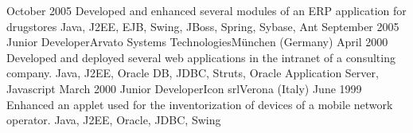 \begin{experiences}
  {October 2005}    {
  					    Developed and enhanced several modules of an ERP application for drugstores
  					}   
                    {Java, J2EE, EJB, Swing, JBoss, Spring, Sybase, Ant}
  \emptySeparator
  \consultantexperience
  {September 2005}   {Junior Developer}{Arvato Systems Technologies}{München (Germany)}
  {April 2000}       {
                     	  Developed and deployed several web applications in the intranet of a consulting company.
                     }
                     {Java, J2EE, Oracle DB, JDBC, Struts, Oracle Application Server, Javascript}
  \emptySeparator
  \consultantexperience
  {March 2000}  	{Junior Developer}{Icon srl}{Verona (Italy)}
  {June 1999}   	{ 
  				 		Enhanced an applet used for the inventorization of devices of a mobile network operator.
  				 	}
                	{Java, J2EE, Oracle, JDBC, Swing} 
\end{experiences}

